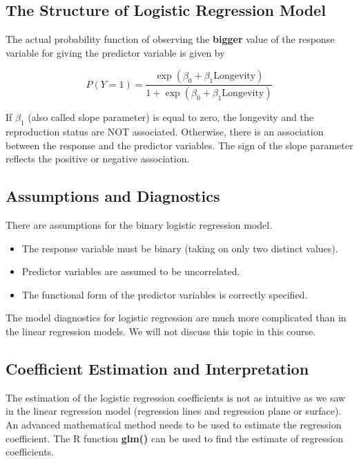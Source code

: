 \documentclass[
]{book}
\begin{document}
\hypertarget{the-structure-of-logistic-regression-model}{%
\subsection{The Structure of Logistic Regression Model}\label{the-structure-of-logistic-regression-model}}

The actual probability function of observing the \textbf{bigger} value of the response variable for giving the predictor variable is given by

\[
P(Y=1) = \frac{\exp(\beta_0 + \beta_1 \text{Longevity})}{1 + \exp(\beta_0 + \beta_1 \text{Longevity})}
\]

If \(\beta_1\) (also called slope parameter) is equal to zero, the longevity and the reproduction status are NOT associated. Otherwise, there is an association between the response and the predictor variables. The sign of the slope parameter reflects the positive or negative association.

\hypertarget{assumptions-and-diagnostics}{%
\subsection{Assumptions and Diagnostics}\label{assumptions-and-diagnostics}}

There are assumptions for the binary logistic regression model.

\begin{itemize}
\item
  The response variable must be binary (taking on only two distinct values).
\item
  Predictor variables are assumed to be uncorrelated.
\item
  The functional form of the predictor variables is correctly specified.
\end{itemize}

The model diagnostics for logistic regression are much more complicated than in the linear regression models. We will not discuss this topic in this course.

\hypertarget{coefficient-estimation-and-interpretation}{%
\subsection{Coefficient Estimation and Interpretation}\label{coefficient-estimation-and-interpretation}}

The estimation of the logistic regression coefficients is not as intuitive as we saw in the linear regression model (regression lines and regression plane or surface). An advanced mathematical method needs to be used to estimate the regression coefficient. The R function \textbf{glm()} can be used to find the estimate of regression coefficients.
\end{document}
